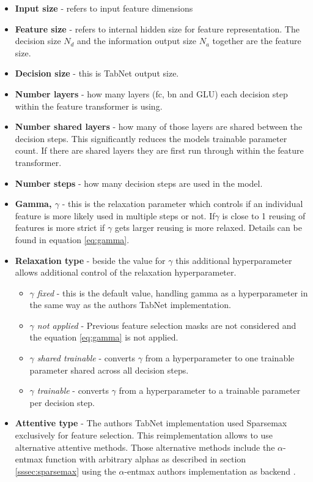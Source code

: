 \documentclass[../main.tex]{subfiles}
\begin{document}
\begin{itemize}
	\item \textbf{Input size} - refers to input feature dimensions
	\item \textbf{Feature size} - refers to internal hidden size for feature representation. The decision size $N_d$ and the information output size $N_a$ together are the feature size.
	\item \textbf{Decision size} - this is TabNet output size.
	\item \textbf{Number layers} - how many layers (\acs{fc}, \acs{bn} and GLU) each decision step within the feature transformer is using.
	\item \textbf{Number shared layers} - how many of those layers are shared between the decision steps. This significantly reduces the models trainable parameter count. If there are shared layers they are first run through within the feature transformer.
	\item \textbf{Number steps} - how many decision steps are used in the model.
	\item \textbf{Gamma, $\gamma$} - this is the relaxation parameter which controls if an individual feature is more likely used in multiple steps or not. If$\gamma$ is close to 1 reusing of features is more strict if $\gamma$ gets larger reusing is more relaxed. Details can be found in equation \ref{eq:gamma}.
	\item \textbf{Relaxation type} - beside the value for $\gamma$ this additional hyperparameter allows additional control of the relaxation hyperparameter.

	\begin{itemize}
		\item \emph{$\gamma$ fixed} - this is the default value, handling gamma as a hyperparameter in the same way as the authors TabNet implementation.
		\item \emph{$\gamma$ not applied} - Previous feature selection masks are not considered and the equation \ref{eq:gamma} is not applied.
		\item \emph{$\gamma$ shared trainable} - converts $\gamma$ from a hyperparameter to one trainable parameter shared across all decision steps. 
		\item \emph{$\gamma$ trainable} - converts $\gamma$ from a hyperparameter to a trainable parameter per decision step. 
	\end{itemize}

	\item \textbf{Attentive type} - The authors TabNet implementation used Sparsemax exclusively for feature selection. This reimplementation allows to use alternative attentive methods. Those alternative methods include the $\alpha$-entmax function with arbitrary alphas as described in section \ref{sssec:sparsemax} using the $\alpha$-entmax authors implementation as backend \cite{noauthor_entmax_2021}.


\end{itemize}
\end{document}
